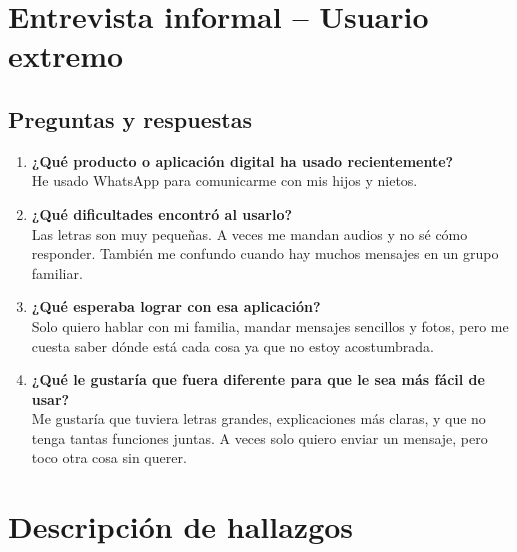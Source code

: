\documentclass{article}
\begin{document}
\section*{Entrevista informal – Usuario extremo}

\subsection*{Preguntas y respuestas}
\begin{enumerate}
  \item \textbf{¿Qué producto o aplicación digital ha usado recientemente?}\\
    He usado WhatsApp para comunicarme con mis hijos y nietos.
  
  \item \textbf{¿Qué dificultades encontró al usarlo?}\\
    Las letras son muy pequeñas. A veces me mandan audios y no sé cómo responder. También me confundo cuando hay muchos mensajes en un grupo familiar.
  
  \item \textbf{¿Qué esperaba lograr con esa aplicación?}\\
    Solo quiero hablar con mi familia, mandar mensajes sencillos y fotos, pero me cuesta saber dónde está cada cosa ya que no estoy acostumbrada.
  
  \item \textbf{¿Qué le gustaría que fuera diferente para que le sea más fácil de usar?}\\
    Me gustaría que tuviera letras grandes, explicaciones más claras, y que no tenga tantas funciones juntas. A veces solo quiero enviar un mensaje, pero toco otra cosa sin querer.
\end{enumerate}

\section*{Descripción de hallazgos}
\end{document}
